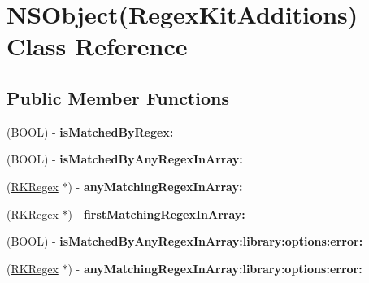 \hypertarget{interface_n_s_object_07_regex_kit_additions_08}{\section{N\-S\-Object(Regex\-Kit\-Additions) Class Reference}
\label{interface_n_s_object_07_regex_kit_additions_08}
}
\subsection*{Public Member Functions}
\begin{DoxyCompactItemize}
\item 
\hypertarget{interface_n_s_object_07_regex_kit_additions_08_a5742930816e67880ce0d193cc74a1cc8}{(B\-O\-O\-L) -\/ {\bfseries is\-Matched\-By\-Regex\-:}}\label{interface_n_s_object_07_regex_kit_additions_08_a5742930816e67880ce0d193cc74a1cc8}

\item 
\hypertarget{interface_n_s_object_07_regex_kit_additions_08_ab4b78415a5d2da85b3f602f52ba98f65}{(B\-O\-O\-L) -\/ {\bfseries is\-Matched\-By\-Any\-Regex\-In\-Array\-:}}\label{interface_n_s_object_07_regex_kit_additions_08_ab4b78415a5d2da85b3f602f52ba98f65}

\item 
\hypertarget{interface_n_s_object_07_regex_kit_additions_08_ae9305db5f4061b437c982c3c557c3619}{(\hyperlink{interface_r_k_regex}{R\-K\-Regex} $\ast$) -\/ {\bfseries any\-Matching\-Regex\-In\-Array\-:}}\label{interface_n_s_object_07_regex_kit_additions_08_ae9305db5f4061b437c982c3c557c3619}

\item 
\hypertarget{interface_n_s_object_07_regex_kit_additions_08_ae699a6853f000d571d0ceec495f45f91}{(\hyperlink{interface_r_k_regex}{R\-K\-Regex} $\ast$) -\/ {\bfseries first\-Matching\-Regex\-In\-Array\-:}}\label{interface_n_s_object_07_regex_kit_additions_08_ae699a6853f000d571d0ceec495f45f91}

\item 
\hypertarget{interface_n_s_object_07_regex_kit_additions_08_a68be21512bf65e926127dcad8dea28e8}{(B\-O\-O\-L) -\/ {\bfseries is\-Matched\-By\-Any\-Regex\-In\-Array\-:library\-:options\-:error\-:}}\label{interface_n_s_object_07_regex_kit_additions_08_a68be21512bf65e926127dcad8dea28e8}

\item 
\hypertarget{interface_n_s_object_07_regex_kit_additions_08_a1551ea492fb037fe491afc2769552223}{(\hyperlink{interface_r_k_regex}{R\-K\-Regex} $\ast$) -\/ {\bfseries any\-Matching\-Regex\-In\-Array\-:library\-:options\-:error\-:}}\label{interface_n_s_object_07_regex_kit_additions_08_a1551ea492fb037fe491afc2769552223}


\end{DoxyCompactItemize}

